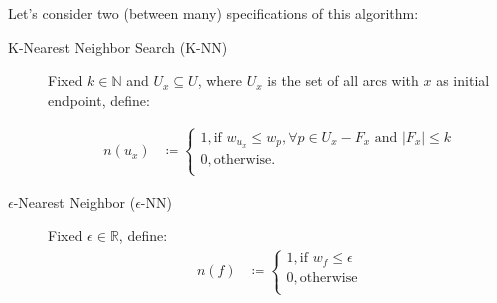 \documentclass[12pt]{report}
\begin{document}
Let's consider two (between many)  specifications of this algorithm:

\begin{description}
	\item[K-Nearest Neighbor Search (K-NN)] Fixed $k \in \mathbb{N}$ and $U_x \subseteq U$, where $U_x$ is the set of all arcs with $x$ as initial endpoint, define:

	\begin{align*}
	n(u_x) &\coloneqq \begin{cases}
		1, \text{if }  w_{u_x} \le w_p, \forall p \in U_x - F_x \text{ and } |F_x| \le k \\
		0, \text{otherwise.} \\
		\end{cases}
	\end{align*}

	\item[$\epsilon$-Nearest Neighbor ($\epsilon$-NN)] Fixed $\epsilon \in\mathbb{R}$, define:
	\begin{align*}
		n(f) &\coloneqq \begin{cases}
			1, \text{if } w_f \le \epsilon \\
			0, \text{otherwise} \\
		\end{cases}
	\end{align*}
\end{description}
\end{document}
